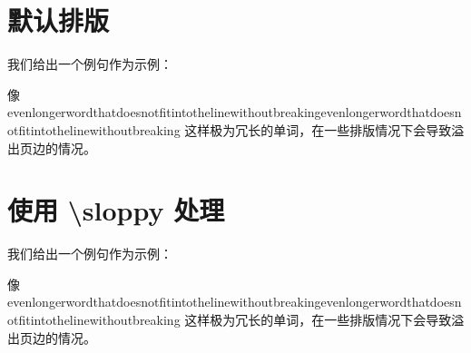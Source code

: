 \documentclass{ctexart}
\begin{document}
\section{默认排版}

我们给出一个例句作为示例：

像 evenlongerwordthatdoesnotfitintothelinewithoutbreakingevenlongerwordthatdoesnotfitintothelinewithoutbreaking 这样极为冗长的单词，在一些排版情况下会导致溢出页边的情况。


\section{使用 \textbackslash sloppy 处理}

\sloppy

我们给出一个例句作为示例：

像 evenlongerwordthatdoesnotfitintothelinewithoutbreakingevenlongerwordthatdoesnotfitintothelinewithoutbreaking 这样极为冗长的单词，在一些排版情况下会导致溢出页边的情况。

\fussy
\end{document}
